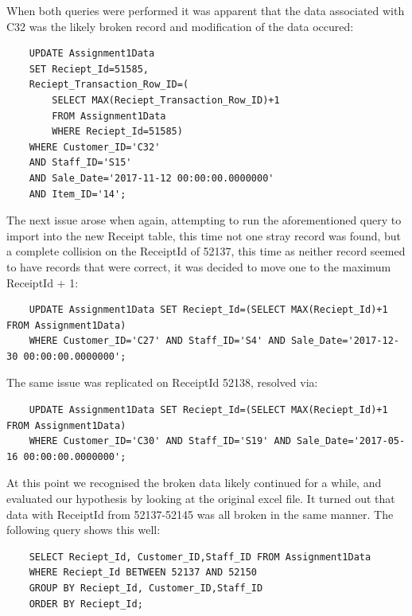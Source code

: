 \documentclass{article}
\begin{document}
            When both queries were performed it was apparent that the data associated with C32 was 
            the likely broken record and modification of the data occured:
            \begin{verbatim}
    UPDATE Assignment1Data 
    SET Reciept_Id=51585, 
    Reciept_Transaction_Row_ID=(
        SELECT MAX(Reciept_Transaction_Row_ID)+1 
        FROM Assignment1Data
        WHERE Reciept_Id=51585)
    WHERE Customer_ID='C32' 
    AND Staff_ID='S15' 
    AND Sale_Date='2017-11-12 00:00:00.0000000' 
    AND Item_ID='14';
            \end{verbatim}
            The next issue arose when again, attempting to run the aforementioned query to import
            into the new Receipt table, this time not one stray record was found, but a complete
            collision on the ReceiptId of 52137, this time as neither record seemed to have 
            records that were correct, it was decided to move one to the maximum ReceiptId + 1:
            \begin{verbatim}
    UPDATE Assignment1Data SET Reciept_Id=(SELECT MAX(Reciept_Id)+1 FROM Assignment1Data) 
    WHERE Customer_ID='C27' AND Staff_ID='S4' AND Sale_Date='2017-12-30 00:00:00.0000000';
            \end{verbatim}
            The same issue was replicated on ReceiptId 52138, resolved via:
            \begin{verbatim}
    UPDATE Assignment1Data SET Reciept_Id=(SELECT MAX(Reciept_Id)+1 FROM Assignment1Data) 
    WHERE Customer_ID='C30' AND Staff_ID='S19' AND Sale_Date='2017-05-16 00:00:00.0000000';
            \end{verbatim}
            At this point we recognised the broken data likely continued for a while, and 
            evaluated our hypothesis by looking at the original excel file. It turned
            out that data with ReceiptId from 52137-52145 was all broken in the same manner.
            The following query shows this well:
            \begin{verbatim}
    SELECT Reciept_Id, Customer_ID,Staff_ID FROM Assignment1Data 
    WHERE Reciept_Id BETWEEN 52137 AND 52150
    GROUP BY Reciept_Id, Customer_ID,Staff_ID 
    ORDER BY Reciept_Id;
            \end{verbatim}
\end{document}
